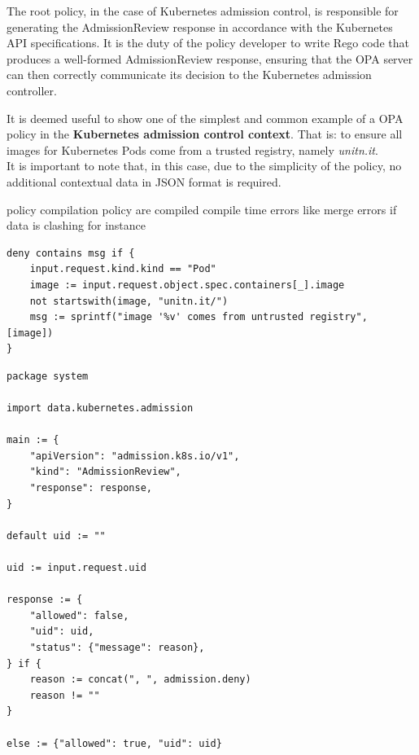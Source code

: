 The root policy, in the case of Kubernetes admission control, is responsible for generating the AdmissionReview response in accordance with the Kubernetes API specifications. It is the duty of the policy developer to write Rego code that produces a well-formed AdmissionReview response, ensuring that the OPA server can then correctly communicate its decision to the Kubernetes admission controller.

It is deemed useful to show one of the simplest and common example of a OPA policy in the \textbf{Kubernetes admission control context}. That is: to ensure all images for Kubernetes Pods come from a trusted registry, namely \textit{unitn.it}. \\


It is important to note that, in this case, due to the simplicity of the policy, no additional contextual data in JSON format is required.


policy compilation
policy are compiled
compile time errors like merge errors if data is clashing for instance

\begin{lstlisting}[language=Rego, caption={Rego policy for Pods registry},
label=lst:rego_data_mapping]                              
deny contains msg if {                                                      
    input.request.kind.kind == "Pod"                                        
    image := input.request.object.spec.containers[_].image                  
    not startswith(image, "unitn.it/")                                     
    msg := sprintf("image '%v' comes from untrusted registry", [image])     
}
\end{lstlisting}

\begin{lstlisting}[language=Rego, caption={Rego ``root" policy (system.main)}]
package system

import data.kubernetes.admission

main := {
	"apiVersion": "admission.k8s.io/v1",
	"kind": "AdmissionReview",
	"response": response,
}

default uid := ""

uid := input.request.uid

response := {
	"allowed": false,
	"uid": uid,
	"status": {"message": reason},
} if {
	reason := concat(", ", admission.deny)
	reason != ""
}

else := {"allowed": true, "uid": uid}
\end{lstlisting}


